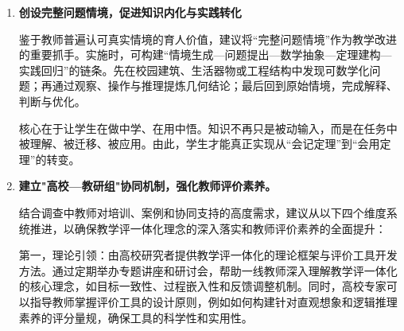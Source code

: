\documentclass[UTF8,a4paper,12pt,twoside]{ctexart}
\begin{document}
\begin{enumerate}
具体实施建议如下：

\begin{itemize}
\item 在课程引入与例题呈现环节，优先通过实物、直观图或三视图唤起学生的空间直观，让学生对问题的几何形态形成清晰的感知（直观感知）；
\item 随后设计可操作的课堂任务——如构建模型、绘制三视图、制作简易辅助线——使学生通过实际操作验证初步观察并修正误判（操作确认）；
\item 在掌握直观与操作结果后，引导学生进入规范的理性表达阶段，用严密的逻辑链条完成证明或推理（思辨论证）。
\end{itemize}

这样的认知序列既强调学习的循序渐进，也为学生由感性认识向理性表达的过渡提供明确路径。与此同时，鼓励在单元复习或专题练习中设计“一题多解”环节：以综合法为主，选取若干题目展示不同解法的思路，让学生比较方法优劣，理解为何在必修教学中优先训练综合法的空间思维与直观推理能力。这样的安排既不削弱学生对方法多样性的认识，也能避免在必修阶段形成单一方法的思维定势。

此外，可在课程拓展或选修环节作为桥梁性内容，安排对向量法的入门性介绍，作为学生进一步深化代数工具与几何直观互补关系的铺垫；但在必修单元评价与教学主线中，应保持对综合法的聚焦，确保学生在直观与证明能力上的稳固发展。

    \item \textbf{创设完整问题情境，促进知识内化与实践转化}

鉴于教师普遍认可真实情境的育人价值，建议将“完整问题情境”作为教学改进的重要抓手。实施时，可构建“情境生成—问题提出—数学抽象—定理建构—实践回归”的链条。先在校园建筑、生活器物或工程结构中发现可数学化问题；再通过观察、操作与推理提炼几何结论；最后回到原始情境，完成解释、判断与优化。

核心在于让学生在做中学、在用中悟。知识不再只是被动输入，而是在任务中被理解、被迁移、被应用。由此，学生才能真正实现从“会记定理”到“会用定理”的转变。

    \item \textbf{建立"高校—教研组"协同机制，强化教师评价素养。}

结合调查中教师对培训、案例和协同支持的高度需求，建议从以下四个维度系统推进，以确保教学评一体化理念的深入落实和教师评价素养的全面提升：

第一，理论引领：由高校研究者提供教学评一体化的理论框架与评价工具开发方法。通过定期举办专题讲座和研讨会，帮助一线教师深入理解教学评一体化的核心理念，如目标一致性、过程嵌入性和反馈调整机制。同时，高校专家可以指导教师掌握评价工具的设计原则，例如如何构建针对直观想象和逻辑推理素养的评分量规，确保工具的科学性和实用性。


\end{enumerate}
\end{document}
